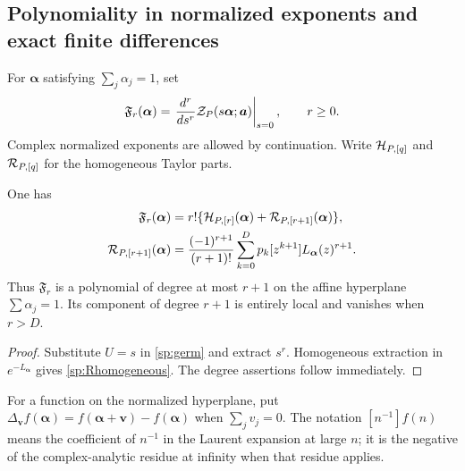 \subsection{Polynomiality in normalized exponents and exact finite differences}

For $\boldsymbol\alpha$ satisfying $\sum_j\alpha_j=1$, set
\begin{equation}\label{sp:F}
 \mathfrak F_r(\boldsymbol\alpha)
   =\left.\frac{d^r}{ds^r}
          \mathcal Z_P(s\boldsymbol\alpha;\boldsymbol a)\right|_{s=0},
 \qquad r\ge0.
\end{equation}
Complex normalized exponents are allowed by continuation. Write
$\mathcal H_{P,[q]}$ and $\mathcal R_{P,[q]}$ for the homogeneous Taylor parts.

\begin{theorem}
\label{sp:thm:polynomial}
One has
\begin{align}
 \mathfrak F_r(\boldsymbol\alpha)
  &=r!\{\mathcal H_{P,[r]}(\boldsymbol\alpha)
                +\mathcal R_{P,[r+1]}(\boldsymbol\alpha)\},\label{sp:homogeneous}\\
 \mathcal R_{P,[r+1]}(\boldsymbol\alpha)
  &=\frac{(-1)^{r+1}}{(r+1)!}
      \sum_{k=0}^D p_k[z^{k+1}]L_{\boldsymbol\alpha}(z)^{r+1}.
 \label{sp:Rhomogeneous}
\end{align}
Thus $\mathfrak F_r$ is a polynomial of degree at most $r+1$ on the
affine hyperplane $\sum\alpha_j=1$. Its component of degree $r+1$
is entirely local and vanishes when $r>D$.
\end{theorem}
\begin{proof}
Substitute $U=s$ in \eqref{sp:germ} and extract $s^r$.
Homogeneous extraction in $e^{-L_{\boldsymbol\alpha}}$ gives
\eqref{sp:Rhomogeneous}. The degree assertions follow immediately.
\end{proof}

For a function on the normalized hyperplane, put
$\Delta_{\boldsymbol v}f(\boldsymbol\alpha)
=f(\boldsymbol\alpha+\boldsymbol v)-f(\boldsymbol\alpha)$ when
$\sum_jv_j=0$. The notation $[n^{-1}]f(n)$ means the coefficient
of $n^{-1}$ in the Laurent expansion at large $n$; it is the negative
of the complex-analytic residue at infinity when that residue applies.

